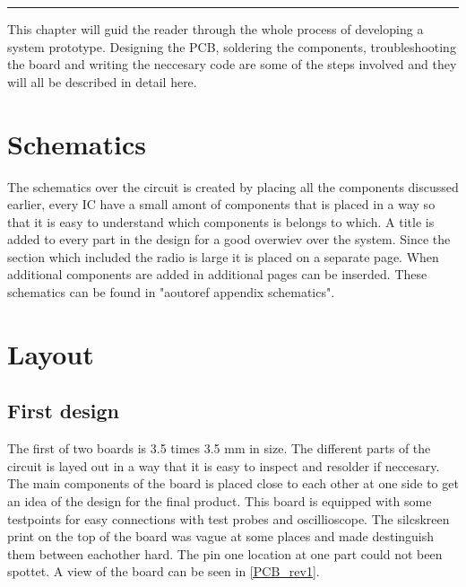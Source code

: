 \vspace{-10ex}%
\rule{\textwidth}{0.3pt}
\vspace{10ex}

This chapter will guid the reader through the whole process of developing a system prototype. Designing the PCB, soldering the components, troubleshooting the board and writing the neccesary code are some of the steps involved and they will all be described in detail here.

\section{Schematics}
The schematics over the circuit is created by placing all the components discussed earlier, every IC have a small amont of components that is placed in a way so that it is easy to understand which components is belongs to which. A title is added to every part in the design for a good overwiev over the system. Since the section which included the radio is large it is placed on a separate page. When additional components are added in additional pages can be inserded. These schematics can be found in "aoutoref appendix schematics".

\section{Layout} 
\subsection{First design} The first of two boards is 3.5 times 3.5 mm in size. The different parts of the circuit is layed out in a way that it is easy to inspect and resolder if neccesary. The main components of the board is placed close to each other at one side to get an idea of the design for the final product. This board is equipped with some testpoints for easy connections with test probes and oscillioscope. The silcskreen print on the top of the board was vague at some places and made destinguish them between eachother hard. The pin one location at one part could not been spottet.  A view of the board can be seen in \autoref{PCB_rev1}. 

